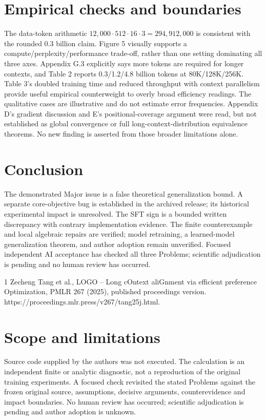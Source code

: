 \documentclass[10pt]{article}
\begin{document}
\section*{Empirical checks and boundaries}
The data-token arithmetic \(12{,}000\cdot512\cdot16\cdot3=294{,}912{,}000\) is consistent with the rounded 0.3 billion claim. Figure 5 visually supports a compute/perplexity/performance trade-off, rather than one setting dominating all three axes. Appendix G.3 explicitly says more tokens are required for longer contexts, and Table 2 reports 0.3/1.2/4.8 billion tokens at 80K/128K/256K. Table 3’s doubled training time and reduced throughput with context parallelism provide useful empirical counterweight to overly broad efficiency readings. The qualitative cases are illustrative and do not estimate error frequencies. Appendix D’s gradient discussion and E’s positional-coverage argument were read, but not established as global convergence or full long-context-distribution equivalence theorems. No new finding is asserted from those broader limitations alone.\par
\section*{Conclusion}
The demonstrated Major issue is a false theoretical generalization bound. A separate core-objective bug is established in the archived release; its historical experimental impact is unresolved. The SFT sign is a bounded written discrepancy with contrary implementation evidence. The finite counterexample and local algebraic repairs are verified; model retraining, a learned-model generalization theorem, and author adoption remain unverified. Focused independent AI acceptance has checked all three Problems; scientific adjudication is pending and no human review has occurred.\par
1 Zecheng Tang et al., LOGO – Long cOntext aliGnment via efficient preference Optimization, PMLR 267 (2025), published proceedings version. https://proceedings.mlr.press/v267/tang25j.html.\par
\section*{Scope and limitations}
Source code supplied by the authors was not executed. The calculation is an independent finite or analytic diagnostic, not a reproduction of the original training experiments. A focused check revisited the stated Problems against the frozen original source, assumptions, decisive arguments, counterevidence and impact boundaries. No human review has occurred; scientific adjudication is pending and author adoption is unknown.\par
\end{document}

